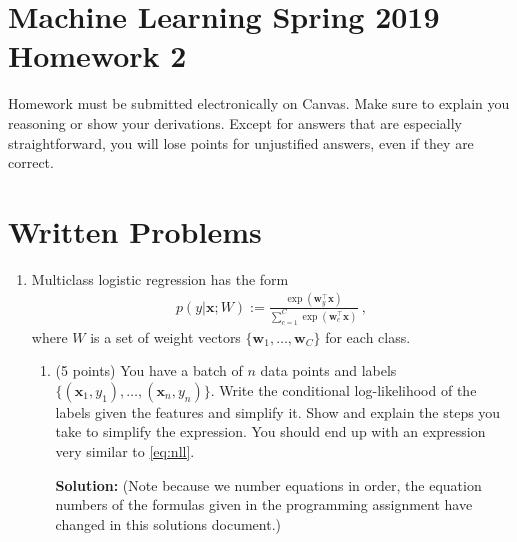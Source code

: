 \documentclass[10pt]{article}
\newcommand{\bx}{{\boldsymbol x}}
\newcommand{\bw}{{\boldsymbol w}}
\newcommand{\solution}[1]{{\color{PineGreen} \textbf{Solution:} #1}}
\begin{document}
\section*{Machine Learning Spring 2019 Homework 2}

Homework must be submitted electronically on Canvas. Make sure to explain you reasoning or show your derivations. Except for answers that are especially straightforward, you will lose points for unjustified answers, even if they are correct. 

\section*{Written Problems}

\begin{enumerate}

\item Multiclass logistic regression has the form
\begin{align}
p(y | \bx; W) := \frac{\exp(\bw_y^\top \bx)}{\sum_{c = 1}^C \exp(\bw_c^\top \bx)} ~,
\label{eq:mclogistic} 
\end{align}
where $W$ is a set of weight vectors $\{\bw_1, \ldots, \bw_C\}$ for each class. 

\begin{enumerate}

\item (5 points) You have a batch of $n$ data points and labels $\{(\bx_1, y_1), \ldots, (\bx_n, y_n)\}$. Write the conditional log-likelihood of the labels given the features and simplify it. Show and explain the steps you take to simplify the expression. You should end up with an expression very similar to \cref{eq:nll}.

\solution{
(Note because we number equations in order, the equation numbers of the formulas given in the programming assignment have changed in this solutions document.)

}
\end{enumerate}
\end{enumerate}
\end{document}
